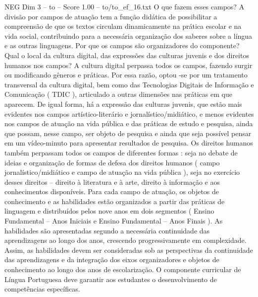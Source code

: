 \begin{textsample}{NEG Dim 3 – to – Score 1.00 – to/to\_ef\_16.txt}
O que fazem esses campos?
A divisão por campos de atuação tem a função didática de possibilitar a compreensão de que os textos circulam dinamicamente na prática escolar e na vida social, contribuindo para a necessária organização dos saberes sobre a língua e as outras linguagens.
Por que os campos são organizadores do componente?
Qual o local da cultura digital, das expressões das culturas juvenis e dos direitos humanos nos campos?
A cultura digital perpassa todos os campos, fazendo surgir ou modificando gêneros e práticas.
Por essa razão, optou -se por um tratamento transversal da cultura digital, bem como das Tecnologias Digitais de Informação e Comunicação ( TDIC ), articulado a outras dimensões nas práticas em que aparecem.
De igual forma, há a expressão das culturas juvenis, que estão mais evidentes nos campos artístico-literário e jornalístico/midiático, e menos evidentes nos campos de atuação na vida pública e das práticas de estudo e pesquisa, ainda que possam, nesse campo, ser objeto de pesquisa e ainda que seja possível pensar em um vídeo-minuto para apresentar resultados de pesquisa.
Os direitos humanos também perpassam todos os campos de diferentes formas : seja no debate de ideias e organização de formas de defesa dos direitos humanos ( campo jornalístico/midiático e campo de atuação na vida pública ), seja no exercício desses direitos – direito à literatura e à arte, direito à informação e aos conhecimentos disponíveis.
Para cada campo de atuação, os objetos de conhecimento e as habilidades estão organizados a partir das práticas de linguagem e distribuídos pelos nove anos em dois segmentos ( Ensino Fundamental – Anos Iniciais e Ensino Fundamental – Anos Finais ).
As habilidades são apresentadas segundo a necessária continuidade das aprendizagens ao longo dos anos, crescendo progressivamente em complexidade.
Assim, as habilidades devem ser consideradas sob as perspectivas da continuidade das aprendizagens e da integração dos eixos organizadores e objetos de conhecimento ao longo dos anos de escolarização.
O componente curricular de Língua Portuguesa deve garantir aos estudantes o desenvolvimento de competências específicas.

\end{textsample}
